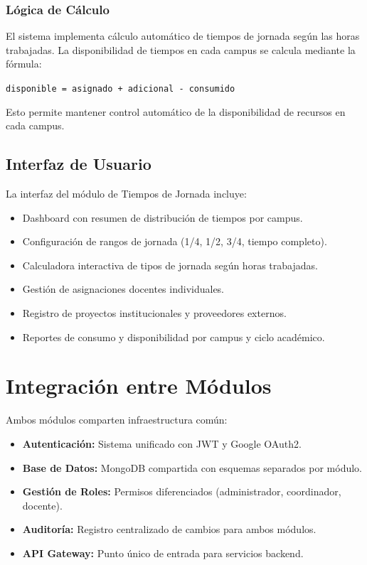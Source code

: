 \subsubsection{Lógica de Cálculo}

El sistema implementa cálculo automático de tiempos de jornada según las horas trabajadas. La disponibilidad de tiempos en cada campus se calcula mediante la fórmula:

\begin{center}
\texttt{disponible = asignado + adicional - consumido}
\end{center}

Esto permite mantener control automático de la disponibilidad de recursos en cada campus.

\subsection{Interfaz de Usuario}

La interfaz del módulo de Tiempos de Jornada incluye:

\begin{itemize}
    \item Dashboard con resumen de distribución de tiempos por campus.
    \item Configuración de rangos de jornada (1/4, 1/2, 3/4, tiempo completo).
    \item Calculadora interactiva de tipos de jornada según horas trabajadas.
    \item Gestión de asignaciones docentes individuales.
    \item Registro de proyectos institucionales y proveedores externos.
    \item Reportes de consumo y disponibilidad por campus y ciclo académico.
\end{itemize}

\section{Integración entre Módulos}

Ambos módulos comparten infraestructura común:

\begin{itemize}
    \item \textbf{Autenticación:} Sistema unificado con JWT y Google OAuth2.
    \item \textbf{Base de Datos:} MongoDB compartida con esquemas separados por módulo.
    \item \textbf{Gestión de Roles:} Permisos diferenciados (administrador, coordinador, docente).
    \item \textbf{Auditoría:} Registro centralizado de cambios para ambos módulos.
    \item \textbf{API Gateway:} Punto único de entrada para servicios backend.
\end{itemize}

